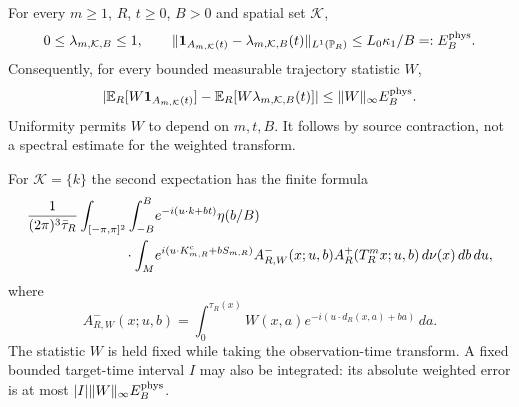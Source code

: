 \begin{theorem}
\label{thm:physical-time-selector-reconstruction}
For every $m\ge1$, $R$, $t\ge0$, $B>0$ and spatial set $\mathcal K$,
\begin{equation}\label{eq:physical-time-source-TV}
 0\le\lambda_{m,\mathcal K,B}\le1,\qquad
 \|\one_{A_{m,\mathcal K}(t)}-\lambda_{m,\mathcal K,B}(t)\|_{L^1(\mathbb P_R)}
                          \le L_0\kappa_1/B=:E_B^{\rm phys}.
\end{equation}
Consequently, for every bounded measurable trajectory statistic $W$,
\begin{equation}\label{eq:physical-time-all-selectors}
 |\mathbb E_R[W\one_{A_{m,\mathcal K}(t)}]
     -\mathbb E_R[W\lambda_{m,\mathcal K,B}(t)]|
                           \le\|W\|_\infty E_B^{\rm phys}.
\end{equation}
Uniformity permits $W$ to depend on $m,t,B$. It follows by source
contraction, not a spectral estimate for the weighted transform.

For $\mathcal K=\{k\}$ the second expectation has the finite formula
\begin{equation}\label{eq:physical-time-weighted-formula}
 \begin{aligned}
 \frac1{(2\pi)^3\bar\tau_R}
 \int_{[-\pi,\pi]^2}\int_{-B}^B
 &e^{-i(u\cdot k+bt)}\eta(b/B)\\
 {}\cdot\int_M &e^{i(u\cdot K^{\rm c}_{m,R}+bS_{m,R})}
 A^-_{R,W}(x;u,b)A^+_R(T_R^mx;u,b)\,d\nu(x)\,db\,du,
 \end{aligned}
\end{equation}
where
\[
 A^-_{R,W}(x;u,b)=\int_0^{\tau_R(x)}
             W(x,a)e^{-i(u\cdot d_R(x,a)+ba)}\,da.
\]
The statistic $W$ is held fixed while taking the observation-time
transform. A fixed bounded target-time interval $I$ may also be
integrated: its absolute weighted error is at most
$|I|\|W\|_\infty E_B^{\rm phys}$.
\end{theorem}
